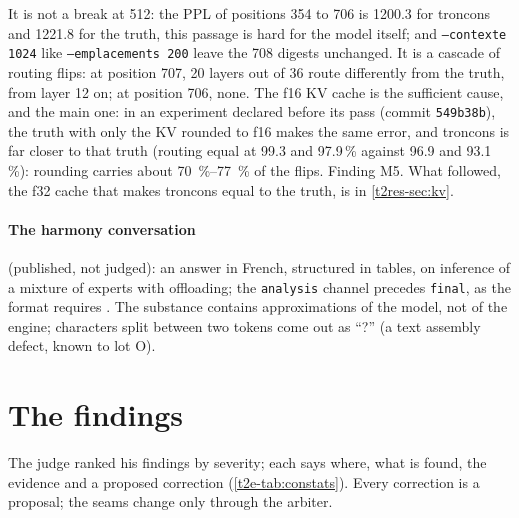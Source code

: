 It is not a break at 512: the PPL of positions 354 to 706 is \num{1200.3} for troncons and \num{1221.8} for the truth, this passage is hard for the model itself; and \texttt{--contexte 1024} like \texttt{--emplacements 200} leave the 708 digests unchanged. It is a cascade of routing flips: at position 707, 20 layers out of 36 route differently from the truth, from layer 12 on; at position 706, none. The f16 KV cache is the sufficient cause, and the main one: in an experiment declared before its pass (commit \texttt{549b38b}), the truth with only the KV rounded to f16 makes the same error, and troncons is far closer to that truth (routing equal at \num{99.3} and \num{97.9}\,\% against \num{96.9} and \num{93.1}\,\%): rounding carries about \SIrange{70}{77}{\percent} of the flips. Finding M5. What followed, the f32 cache that makes troncons equal to the truth, is in \cref{t2res-sec:kv}.

\paragraph{The harmony conversation} (published, not judged): an answer in French, structured in tables, on inference of a mixture of experts with offloading; the \texttt{analysis} channel precedes \texttt{final}, as the format requires \cite{openai2025harmony}. The substance contains approximations of the model, not of the engine; characters split between two tokens come out as ``\textsf{?}'' (a text assembly defect, known to lot O).

\section{The findings}\label{t2e-sec:constats}

The judge ranked his findings by severity; each says where, what is found, the evidence and a proposed correction (\cref{t2e-tab:constats}). Every correction is a proposal; the seams change only through the arbiter.

